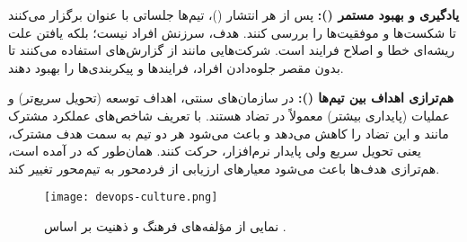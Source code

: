 \textbf{یادگیری و بهبود مستمر ():} پس از هر انتشار ()، تیم‌ها جلساتی با عنوان  برگزار می‌کنند تا شکست‌ها و موفقیت‌ها را بررسی کنند. هدف، سرزنش افراد نیست؛ بلکه یافتن علت ریشه‌ای خطا و اصلاح فرایند است. شرکت‌هایی مانند  از گزارش‌های  استفاده می‌کنند تا بدون مقصر جلوه‌دادن افراد، فرایندها و پیکربندی‌ها را بهبود دهند.

\textbf{هم‌ترازی اهداف بین تیم‌ها ():} در سازمان‌های سنتی، اهداف توسعه (تحویل سریع‌تر) و عملیات (پایداری بیشتر) معمولاً در تضاد هستند.  با تعریف شاخص‌های عملکرد مشترک مانند  و  این تضاد را کاهش می‌دهد و باعث می‌شود هر دو تیم به سمت هدف مشترک، یعنی تحویل سریع ولی پایدار نرم‌افزار، حرکت کنند. همان‌طور که در \cite{Jha2023} آمده است، هم‌ترازی هدف‌ها باعث می‌شود معیارهای ارزیابی از فردمحور به تیم‌محور تغییر کند.

\begin{figure}[H]
    \centering
    \texttt{[image: devops-culture.png]}
    \caption{نمایی از مؤلفه‌های فرهنگ و ذهنیت  بر اساس \cite{Jha2023}.}
    \label{fig:devops-culture}
\end{figure}
